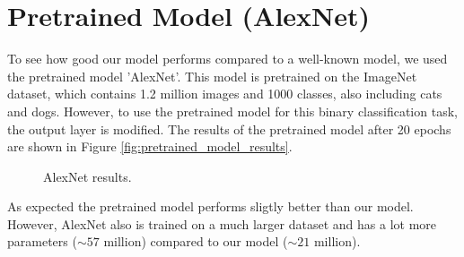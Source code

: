 \section{Pretrained Model (AlexNet)}
To see how good our model performs compared to a well-known model, we used the pretrained model 'AlexNet'.
This model is pretrained on the ImageNet dataset, which contains 1.2 million images and 1000 classes, also including cats and dogs.
However, to use the pretrained model for this binary classification task, the output layer is modified.
The results of the pretrained model after 20 epochs are shown in Figure \ref{fig:pretrained_model_results}.

\begin{figure}[H]
    \vspace*{-0.7cm}
    \centering
    \hspace{0.4cm}
    \caption{AlexNet results.}
    \label{fig:alexnet}
    \vspace*{-0.7cm}
\end{figure}


As expected the pretrained model performs sligtly better than our model.
However, AlexNet also is trained on a much larger dataset and has a lot more parameters ($\sim 57$ million) compared to our model ($\sim 21$ million).